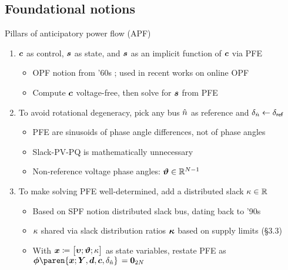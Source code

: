 \subsection{Foundational notions}

\begin{frame}[t]{Pillars of anticipatory power flow (APF)}{}
    \begin{enumerate}
    \item <1->
    \(\boldsymbol{c}\) as \textcolor<1>{CornellRed}{control},
    \(\boldsymbol{s}\) as \textcolor<1>{CornellRed}{state},
    and
    \textcolor<1>{CornellRed}{\(\boldsymbol{s}\) as an implicit function of \(\boldsymbol{c}\)} via PFE
    \begin{itemize}
        \item OPF notion from '60s \cite[\S 2.4]{FrankRebennack2016};
            used in recent works on online OPF \cite{GanLow2016,Tang+2017}
        \item[\faLightbulb] Compute \(\boldsymbol{c}\) voltage-free,
            then solve for \(\boldsymbol{s}\) from PFE
    \end{itemize}

    \vspace{1em}
    \item <2->
    To \textcolor<2>{CornellRed}{avoid rotational degeneracy},
    pick \textcolor<2>{CornellRed}{any} bus \(\hat{n}\) as reference
    and \(\delta_{\hat{n}} \gets \delta_{\mathsf{ref}}\)
    \begin{itemize}
        \item PFE are \textcolor<2>{CornellRed}{sinusoids of phase angle differences},
            not of phase angles
        \item Slack-PV-PQ is \textcolor<2>{CornellRed}{mathematically unnecessary}
            \cite[\S 2.2.1]{MolzahnHiskens2019}
        \item[\faLightbulb] Non-reference voltage phase angles:
            \(\boldsymbol{\vartheta} \in \mathbb{R}^{N-1}\)
    \end{itemize}

    \vspace{1em}
    \item <3>
    To make \textcolor<3>{CornellRed}{solving PFE well-determined},
    add a \textcolor<3>{CornellRed}{distributed slack \(\kappa \in \mathbb{R}\)}
    \begin{itemize}
        \item Based on SPF notion \textcolor<3>{CornellRed}{distributed slack bus},
            dating back to '90s \cite{Meisel1993}
        \item \(\kappa\) shared via
            \textcolor<3>{CornellRed}{slack distribution ratios \(\boldsymbol{\kappa}\)}
            based on supply limits (\S 3.3)
        \item[\faLightbulb] With
            \(\PFEVars\coloneqq\begin{bmatrix*}\BusMs;\PFEBusAs;\PFESlack\end{bmatrix*}\)
            as state variables, restate PFE as
            \(\Resids\paren{\PFEVars;\Ybus,\DemDrws,\SupInjs,\BusA{\PFERefBus}}
            \,=\ZerosVec[2\NumBuses]\)
    \end{itemize}
    \end{enumerate}
\end{frame}
